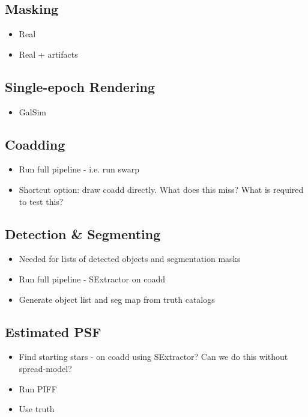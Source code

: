 \documentclass[\docopts]{\docclass}
\begin{document}
\subsection{Masking}

\begin{itemize}
\item Real
\item Real + artifacts
\end{itemize}

\subsection{Single-epoch Rendering}

\begin{itemize}
\item GalSim
\end{itemize}

\subsection{Coadding}
\begin{itemize}
\item Run full pipeline - i.e. run swarp
\item Shortcut option: draw coadd directly. What does this miss? What is required to test this?
\end{itemize}

\subsection{Detection \& Segmenting}
\begin{itemize}
\item Needed for lists of detected objects and segmentation masks
\item Run full pipeline - SExtractor on coadd
\item Generate object list and seg map from truth catalogs
\end{itemize}

\subsection{Estimated PSF}
\begin{itemize}

\item Find starting stars - on coadd using SExtractor? Can we do this without spread-model?

\item Run PIFF
\item Use truth
\end{itemize}
\end{document}
